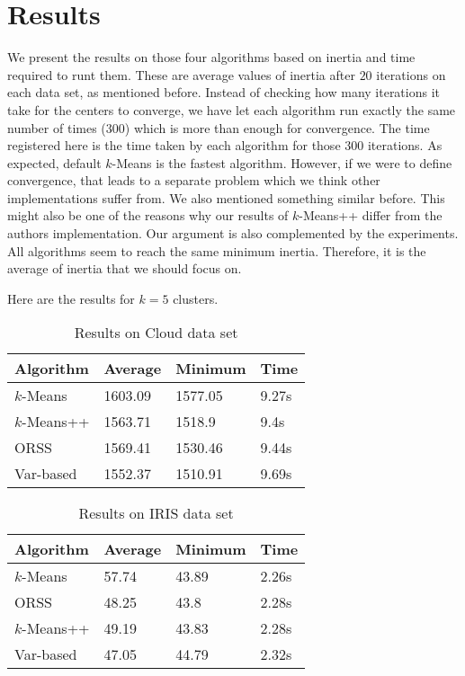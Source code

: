 \documentclass[twoside, 11pt]{article}
\begin{document}
	\section{Results}
	We present the results on those four algorithms based on inertia and time required to runt them. These are average values of inertia after $20$ iterations on each data set, as mentioned before. Instead of checking how many iterations it take for the centers to converge, we have let each algorithm run exactly the same number of times ($300$) which is more than enough for convergence. The time registered here is the time taken by each algorithm for those $300$ iterations. As expected, default $k$-Means is the fastest algorithm. However, if we were to define convergence, that leads to a separate problem which we think other implementations suffer from. We also mentioned something similar before. This might also be one of the reasons why our results of $k$-Means++ differ from the authors implementation. Our argument is also complemented by the experiments. All algorithms seem to reach the same minimum inertia. Therefore, it is the average of inertia that we should focus on.
	
	Here are the results for $k=5$ clusters.
		\begin{table}
			\begin{center}
				\begin{tabular}{|l|l|l|l|}
					\hline
					Algorithm & Average & Minimum & Time\\\hline
					$k$-Means & 1603.09& 1577.05& 9.27s\\\hline
					$k$-Means++ & 1563.71& 1518.9& 9.4s\\\hline
					ORSS & 1569.41& 1530.46& 9.44s\\\hline
					Var-based & 1552.37& 1510.91& 9.69s\\\hline
				\end{tabular}
			\caption{Results on Cloud data set}
			\end{center}
		\label{tbl:cloud}
		\end{table}
	
		\begin{table}
			\begin{center}
				\begin{tabular}{|l|l|l|l|}
					\hline
					Algorithm & Average & Minimum & Time\\\hline
					$k$-Means & 57.74& 43.89& 2.26s\\\hline
					ORSS & 48.25& 43.8& 2.28s\\\hline
					$k$-Means++ & 49.19& 43.83& 2.28s\\\hline
					Var-based & 47.05& 44.79& 2.32s\\\hline
				\end{tabular}
				\caption{Results on IRIS data set}
			\end{center}
			\label{tbl:iris}
		\end{table}
\end{document}
